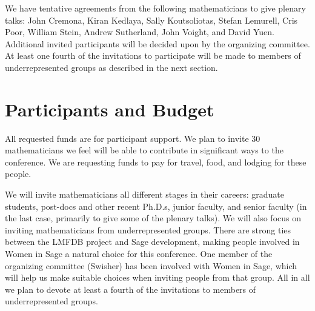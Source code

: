 \documentclass[12pt]{amsart}
\numberwithin{equation}{section}
\begin{document}
We have tentative agreements from the following mathematicians to give
plenary talks:
John Cremona, Kiran Kedlaya, Sally Koutsoliotas, Stefan Lemurell, 
Cris Poor, William Stein, Andrew Sutherland, John Voight, and David Yuen.
Additional invited participants will be decided upon by the organizing
committee.  At least one fourth of the invitations to participate will
be made to members of underrepresented groups as described in the next
section.





\section{Participants and Budget}

All requested funds are for participant support.  We plan to invite
$30$ mathematicians we feel will be able to contribute in significant
ways to the conference.  We are requesting funds to pay for travel,
food, and lodging for these people.

We will invite mathematicians all different stages in their careers:
graduate students, post-docs and other recent Ph.D.s, junior faculty,
and senior faculty (in the last case, primarily to give some of the
plenary talks).  We will also focus on inviting mathematicians from
underrepresented groups.  There are strong ties between the
\textsf{LMFDB} project and \textsf{Sage} development, making people
involved in Women in Sage a natural choice for this conference.  One
member of the organizing committee (Swisher) has been involved with
Women in Sage, which will help us make suitable choices when inviting
people from that group.  All in all we plan to
devote at least a fourth of the invitations to members of
underrepresented groups.
\end{document}
